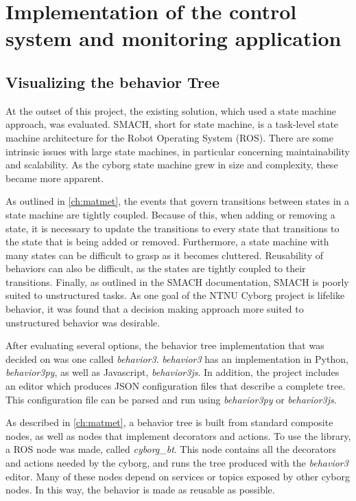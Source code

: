 \documentclass[\rootfolder/main.tex]{subfiles}
\begin{document}
\chapter{Implementation of the control system and monitoring application} %

\label{ch:foo} %

\section{Visualizing the behavior Tree}

At the outset of this project, the existing solution, which used a state machine approach, was evaluated.
SMACH, short for state machine, is a task-level state machine architecture for the Robot Operating System (ROS).
There are some intrinsic issues with large state machines, in particular concerning maintainability and scalability.
As the cyborg state machine grew in size and complexity, these became more apparent.

As outlined in \cref{ch:matmet}, the events that govern transitions between states in a state machine are tightly coupled.
Because of this, when adding or removing a state, it is necessary to update the transitions to every state that transitions to the state that is being added or removed.
Furthermore, a state machine with many states can be difficult to grasp as it becomes cluttered.
Reusability of behaviors can also be difficult, as the states are tightly coupled to their transitions.
Finally, as outlined in the SMACH documentation, SMACH is poorly suited to unstructured tasks.
As one goal of the NTNU Cyborg project is lifelike behavior, it was found that a decision making approach more suited to unstructured behavior was desirable.

After evaluating several options, the behavior tree implementation that was decided on was one called \emph{behavior3}.
\emph{behavior3} has an implementation in Python, \emph{behavior3py}, as well as Javascript, \emph{behavior3js}.
In addition, the project includes an editor which produces JSON configuration files that describe a complete tree. 
This configuration file can be parsed and run using \emph{behavior3py} or \emph{behavior3js}.

As described in \cref{ch:matmet}, a behavior tree is built from standard composite nodes, as well as nodes that implement decorators and actions.
To use the library, a ROS node was made, called \emph{cyborg\_bt}. 
This node contains all the decorators and actions needed by the cyborg, and runs the tree produced with the \emph{behavior3} editor.
Many of these nodes depend on services or topics exposed by other cyborg nodes.
In this way, the behavior is made as reusable as possible.
\end{document}
